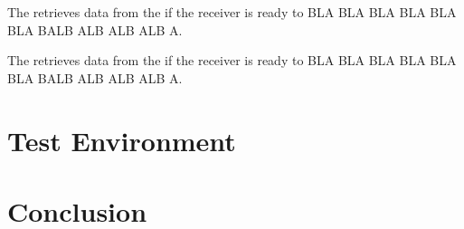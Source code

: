 \documentclass[12pt]{article}
\begin{document}
The \paritycheck retrieves data from the \fifo if the receiver is ready to BLA BLA BLA BLA BLA BLA BALB ALB ALB ALB A.

The \paritycheck retrieves data from the \fifo if the receiver is ready to BLA BLA BLA BLA BLA BLA BALB ALB ALB ALB A.

\section{Test Environment}


\section{Conclusion}
\end{document}
